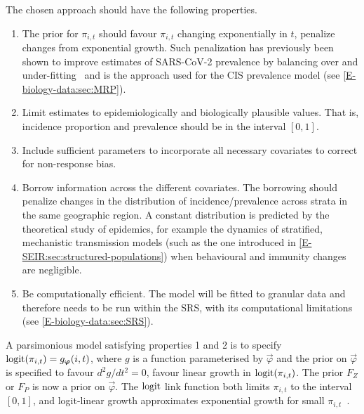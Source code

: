 \documentclass[thesis.tex]{subfiles}
\begin{document}
The chosen approach should have the following properties.
\begin{enumerate}
    \item The prior for $\pi_{i,t}$ should favour $\pi_{i,t}$ changing exponentially in $t$, \ie penalize changes from exponential growth.
        Such penalization has previously been shown to improve estimates of SARS-CoV-2 prevalence by balancing over and under-fitting~\autocite{ealesAppropriately} and is the approach used for the CIS prevalence model (see \cref{E-biology-data:sec:MRP}).
    \item Limit estimates to epidemiologically and biologically plausible values.
        That is, incidence proportion and prevalence should be in the interval $[0, 1]$.
    \item Include sufficient parameters to incorporate all necessary covariates to correct for non-response bias.
    \item Borrow information across the different covariates.
        The borrowing should penalize changes in the distribution of incidence/prevalence across strata in the same geographic region.
        A constant distribution is predicted by the theoretical study of epidemics, for example the dynamics of stratified, mechanistic transmission models (such as the one introduced in \cref{E-SEIR:sec:structured-populations}) when behavioural and immunity changes are negligible.
    \item Be computationally efficient.
        The model will be fitted to granular data and therefore needs to be run within the SRS, with its computational limitations (see \cref{E-biology-data:sec:SRS}).
\end{enumerate}

A parsimonious model satisfying properties 1 and 2 is to specify $\operatorname{logit}(\pi_{i,t}) = g_{\bm{\varphi}}(i, t)$, where $g$ is a function parameterised by ${\vec{\varphi}}$ and the prior on ${\vec{\varphi}}$ is specified to favour $d^2g/dt^2 = 0$, \ie favour linear growth in $\operatorname{logit}(\pi_{i,t})$.
The prior $F_Z$ or $F_P$ is now a prior on ${\vec{\varphi}}$.
The $\operatorname{logit}$ link function both limits $\pi_{i,t}$ to the interval $[0, 1]$, and logit-linear growth approximates exponential growth for small $\pi_{i,t}$~\autocite{ealesAppropriately}.
\end{document}
